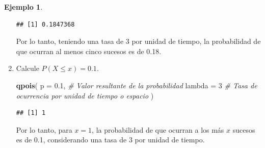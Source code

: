\documentclass[
  11pt,
]{book}
\newenvironment{Shaded}{\begin{snugshade}}{\end{snugshade}}
\newcommand{\AttributeTok}[1]{\textcolor[rgb]{0.13,0.29,0.53}{#1}}
\newcommand{\CommentTok}[1]{\textcolor[rgb]{0.56,0.35,0.01}{\textit{#1}}}
\newcommand{\DecValTok}[1]{\textcolor[rgb]{0.00,0.00,0.81}{#1}}
\newcommand{\FloatTok}[1]{\textcolor[rgb]{0.00,0.00,0.81}{#1}}
\newcommand{\FunctionTok}[1]{\textcolor[rgb]{0.13,0.29,0.53}{\textbf{#1}}}
\newcommand{\NormalTok}[1]{#1}
\theoremstyle{definition}
\theoremstyle{definition}
\newtheorem{example}{Ejemplo}[chapter]
\theoremstyle{definition}
\theoremstyle{definition}
\theoremstyle{remark}
\begin{document}
\begin{example}
\begin{enumerate}
\begin{verbatim}
## [1] 0.1847368
\end{verbatim}

  Por lo tanto, teniendo una tasa de 3 por unidad de tiempo, la probabilidad de que ocurran al menos cinco sucesos es de 0.18.
\item
  Calcule \(P(X\leq x) = 0.1\).

\begin{Shaded}
\begin{Highlighting}[]
\FunctionTok{qpois}\NormalTok{(}
  \AttributeTok{p =} \FloatTok{0.1}\NormalTok{, }\CommentTok{\# Valor resultante de la probabilidad}
  \AttributeTok{lambda =} \DecValTok{3} \CommentTok{\# Tasa de ocurrencia por unidad de tiempo o espacio}
\NormalTok{  )}
\end{Highlighting}
\end{Shaded}

\begin{verbatim}
## [1] 1
\end{verbatim}

  Por lo tanto, para \(x=1\), la probabilidad de que ocurran a los más \(x\) sucesos es de 0.1, considerando una tasa de 3 por unidad de tiempo.
\end{enumerate}

\end{example}
\end{document}
